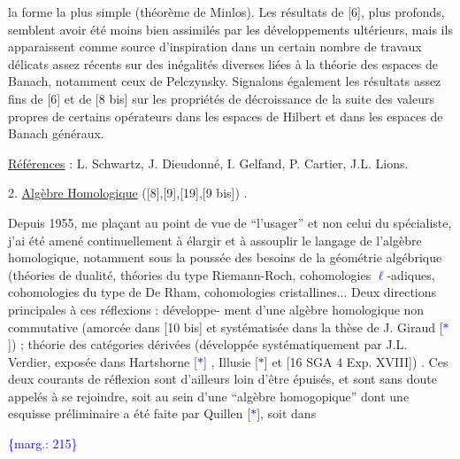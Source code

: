 \documentclass[11pt]{article}
\newcommand{\scanpage}[1]{\par\bigskip\noindent{\small\sffamily[scan #1]}\par}
\newcommand{\mspage}[1]{{\small\sffamily[p.\,#1]}}
\newcommand{\hand}[1]{\textcolor{blue}{#1}}
\newcommand{\margin}[1]{\textcolor{blue}{\{\textsf{marg.:} #1\}}}
\newcommand{\uline}[1]{\underline{#1}}
\begin{document}
\mspage{\hand{214}}

\clearpage
\scanpage{119/215}
\mspage{. 2 .}

la forme la plus simple (théorème de Minlos). Les
résultats de [6], plus profonds, semblent avoir été
moins bien assimilés par les développements ultérieurs,
mais ils apparaissent comme source d'inspiration dans
un certain nombre de travaux délicats assez récents
sur des inégalités diverses liées à la théorie des
espaces de Banach, notamment ceux de Pelczynsky. Signalons
également les résultats assez fins de [6] et de [8 bis]
sur les propriétés de décroissance de la suite des
valeurs propres de certains opérateurs dans les espaces
de Hilbert et dans les espaces de Banach généraux.

\uline{Références} : L. Schwartz, J. Dieudonné, I. Gelfand,
P. Cartier, J.L. Lions.

2. \uline{Algèbre Homologique} ([8],[9],[19],[9 bis]) .

Depuis 1955, me plaçant au point de vue de
``l'usager'' et non celui du spécialiste, j'ai été amené
continuellement à élargir et à assouplir le langage
de l'algèbre homologique, notamment sous la poussée des
besoins de la géométrie algébrique (théories de dualité,
théories du type Riemann-Roch, cohomologies \hand{$\ell$}-adiques,
cohomologies du type de De Rham, cohomologies cristallines...
Deux directions principales à ces réflexions : développe-%
ment d'une algèbre homologique non commutative (amorcée
dans [10 bis] et systématisée dans la thèse de J. Giraud
[\hand{$*$}]) ; théorie des catégories dérivées (développée
systématiquement par J.L. Verdier, exposée dans
Hartshorne [\hand{$*$}] , Illusie [\hand{$*$}] et [16 SGA 4 Exp. XVIII]) .
Ces deux courants de réflexion sont d'ailleurs loin
d'être épuisés, et sont sans doute appelés à se rejoindre,
soit au sein d'une ``algèbre homogopique'' dont une esquisse
préliminaire a été faite par Quillen [\hand{$*$}], soit dans

\margin{215}

\clearpage
\scanpage{119/216}
\mspage{. 3 .}
\end{document}

